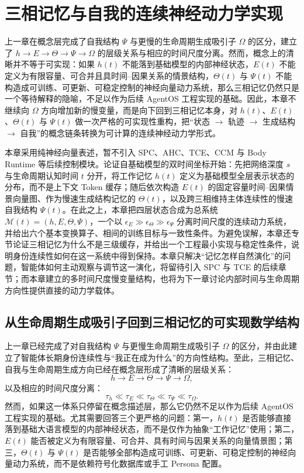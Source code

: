 \chapter{三相记忆与自我的连续神经动力学实现}
\label{chap:tri_memory_neural_dynamics}

\begin{chapterlead}
上一章在概念层完成了自我结构 $\Psi$ 与更慢的生命周期生成吸引子 $\Omega$ 的区分，建立了 $h \rightarrow E \rightarrow \Theta \rightarrow \Psi \rightarrow \Omega$ 的层级关系与相应的时间尺度分离。然而，概念上的清晰并不等于可实现：如果 $h(t)$ 不能落到基础模型的内部神经状态，$E(t)$ 不能定义为有限容量、可合并且具时间--因果关系的情景结构，$\Theta(t)$ 与 $\Psi(t)$ 不能构造成可训练、可更新、可稳定控制的神经向量动力系统，那么三相记忆仍然只是一个等待解释的隐喻，不足以作为后续 AgentOS 工程实现的基础。因此，本章不继续向 $\Omega$ 方向增加新的慢变量，而是向下回到三相记忆本身，对 $h(t)$、$E(t)$、$\Theta(t)$ 与 $\Psi(t)$ 做一次严格的可实现性重构，把“状态 $\rightarrow$ 轨迹 $\rightarrow$ 生成结构 $\rightarrow$ 自我”的概念链条转换为可计算的连续神经动力学形式。

本章采用纯神经向量表述，暂不引入 SPC、AHC、TCE、CCM 与 Body Runtime 等后续控制模块。论证自基础模型的双时间坐标开始：先把网络深度 $s$ 与生命周期认知时间 $t$ 分开，将工作记忆 $h(t)$ 定义为基础模型全层表示状态的分布，而不是上下文 Token 缓存；随后依次构造 $E(t)$ 的固定容量时间--因果情景向量图、作为慢速生成结构记忆的 $\Theta(t)$，以及跨三相维持主体连续性的慢速自我结构 $\Psi(t)$。在此之上，本章把四层状态合成为总系统 $\mathcal{M}(t)=(h,E,\Theta,\Psi)$，一个以 $\epsilon_E \gg \epsilon_\Theta \gg \epsilon_\Psi$ 分离时间尺度的连续动力系统，并给出六个基本变换算子、相间的训练目标与一致性条件。为避免误解，本章还专节论证三相记忆为什么不是三级缓存，并给出一个工程最小实现与稳定性条件，说明身份连续性如何在这一系统中得到保持。本章只解决“记忆怎样自然演化”的问题，智能体如何主动观察与调节这一演化，将留待引入 SPC 与 TCE 的后续章节；而本章建立的多时间尺度慢变量结构，也将为下一章讨论内部时间与生命周期方向性提供直接的动力学载体。
\end{chapterlead}

\section{从生命周期生成吸引子回到三相记忆的可实现数学结构}

上一章已经完成了对自我结构 $\Psi$ 与更慢生命周期生成吸引子 $\Omega$ 的区分，并由此建立了智能体长期身份连续性与“我正在成为什么”的方向性结构。至此，三相记忆、自我与生命周期生成方向已经在概念层形成了清晰的层级关系：
\[
h \rightarrow E \rightarrow \Theta \rightarrow \Psi \rightarrow \Omega,
\]
以及相应的时间尺度分离：
\[
\tau_h \ll \tau_E \ll \tau_\Theta \ll \tau_\Psi \ll \tau_\Omega.
\]
然而，如果这一体系只停留在概念描述层，那么它仍然不足以作为后续 AgentOS 工程实现的基础。尤其需要回答三个更严格的问题：第一，$h(t)$ 是否能够直接落到基础大语言模型的内部神经状态，而不是仅作为抽象“工作记忆”使用；第二，$E(t)$ 能否被定义为有限容量、可合并、具有时间与因果关系的向量情景图；第三，$\Theta(t)$ 与 $\Psi(t)$ 是否能够全部构造成可训练、可更新、可稳定控制的神经向量动力系统，而不是依赖符号化数据库或手工 Persona 配置。

